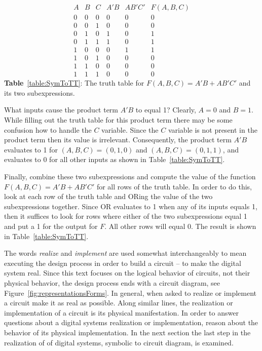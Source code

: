 $$\begin{array}{c|c|c||c|c||c}
A & B & C & A'B & AB'C' & F(A,B,C) \\ \hline \hline
0 & 0 & 0 & 0  &  0 &  0  \\ \hline
0 & 0 & 1 & 0  &  0 &  0  \\ \hline
0 & 1 & 0 & 1  &  0 &  1  \\ \hline
0 & 1 & 1 & 1  &  0 &  1  \\ \hline
1 & 0 & 0 & 0  &  1 &  1  \\ \hline
1 & 0 & 1 & 0  &  0 &  0  \\ \hline
1 & 1 & 0 & 0  &  0 &  0  \\ \hline
1 & 1 & 1 & 0  &  0 &  0 
\end{array} $$
\textbf{Table}~\ref{table:SymToTT}: The truth table for $F(A,B,C) = A'B + AB'C'$ and its  two subexpressions.


What inputs cause the product term $A'B$ to equal 1?  Clearly, $A=0$ and $B=1$.
While filling out the truth table for this product term there may be some
confusion
how to handle the $C$ variable.  Since the $C$ variable is not present in the 
product term then its value is irrelevant. Consequently, the product term $A'B$
evaluates to 1 for $(A,B,C)=(0,1,0)$ and $(A,B,C)=(0,1,1)$, and evaluates to 0
for all other inputs as shown in Table~\ref{table:SymToTT}.

Finally, combine these two subexpressions and compute the value
of the function $F(A,B,C) = A'B + AB'C'$ for all rows of the truth table. In 
order to do this, look at each row of the truth table and ORing the value of 
the two
subexpressions together.  Since OR evaluates to 1 when any of its inputs equals
1, then it suffices to look for rows where either of the two subexpressions equal
1 and put a 1 for the output for $F$.  All other rows will equal 0.  The result 
is shown in Table~\ref{table:SymToTT}.

The words \textit{ realize} and \textit{implement}   
are used somewhat interchangeably to mean executing the design
process in order to build a circuit -- to make the digital system real.  
Since this text focuses on the logical 
behavior of circuits, not their physical behavior, the design process ends with
a circuit diagram, see Figure~\ref{fig:representationsForms}.  In general, when asked
to realize or implement a circuit make it as real as 
possible.  Along similar lines, the realization or implementation of a circuit 
is its physical manifestation.  In order to answer questions about a 
digital systems realization or implementation, reason about the behavior of its 
physical implementation.  In the next section the last step in the realization
of of digital systems, symbolic to circuit diagram, is examined.


